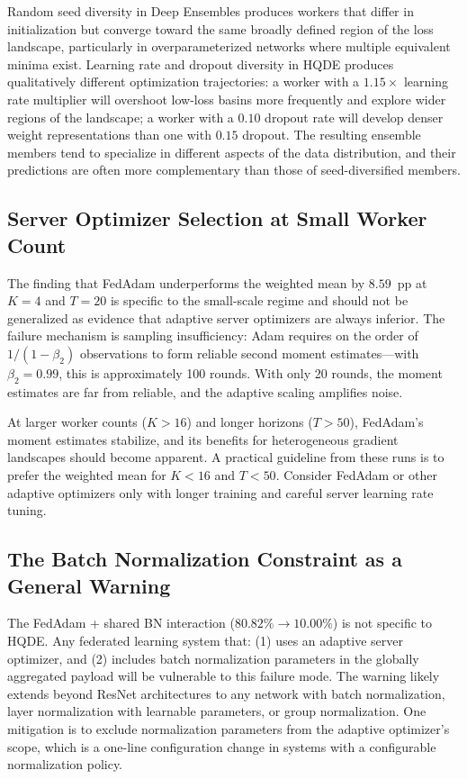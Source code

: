 \documentclass[journal,twoside]{IEEEtran}
\newcommand{\hqde}{\mbox{HQDE}\xspace}
\begin{document}
Random seed diversity in Deep Ensembles produces workers that differ
in initialization but converge toward the same broadly defined region
of the loss landscape, particularly in overparameterized networks
where multiple equivalent minima exist. Learning rate and dropout
diversity in \hqde{} produces qualitatively different optimization
trajectories: a worker with a $1.15\times$ learning rate multiplier
will overshoot low-loss basins more frequently and explore wider
regions of the landscape; a worker with a $0.10$ dropout rate will
develop denser weight representations than one with $0.15$ dropout.
The resulting ensemble members tend to specialize in different aspects
of the data distribution, and their predictions are often more
complementary than those of seed-diversified members.

\subsection{Server Optimizer Selection at Small Worker Count}

The finding that FedAdam underperforms the weighted mean by $8.59$~pp
at $K=4$ and $T=20$ is specific to the small-scale regime and should
not be generalized as evidence that adaptive server optimizers are
always inferior. The failure mechanism is sampling insufficiency:
Adam requires on the order of $1/(1-\beta_2)$ observations to
form reliable second moment estimates---with $\beta_2=0.99$, this
is approximately 100 rounds. With only 20 rounds, the moment estimates
are far from reliable, and the adaptive scaling amplifies noise.

At larger worker counts ($K>16$) and longer horizons ($T>50$),
FedAdam's moment estimates stabilize, and its benefits for
heterogeneous gradient landscapes should become apparent. A practical
guideline from these runs is to prefer the weighted mean for $K < 16$
and $T < 50$. Consider FedAdam or other adaptive optimizers only with
longer training and careful server learning rate tuning.

\subsection{The Batch Normalization Constraint as a General Warning}

The FedAdam + shared BN interaction ($80.82\% \to 10.00\%$)
is not specific to \hqde{}. Any federated learning system that:
(1) uses an adaptive server optimizer, and (2) includes batch
normalization parameters in the globally aggregated payload
will be vulnerable to this failure mode. The warning likely extends
beyond ResNet architectures to any network with batch normalization,
layer normalization with learnable parameters, or group normalization.
One mitigation is to exclude normalization parameters from the adaptive
optimizer's scope, which is a one-line configuration change in systems
with a configurable normalization policy.
\end{document}
